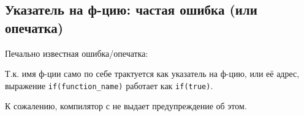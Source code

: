 \subsection{Указатель на ф-цию: частая ошибка (или опечатка)}

Печально известная ошибка/опечатка:



Т.к. имя ф-ции само по себе трактуется как указатель на ф-цию, или её адрес,\\
выражение \verb|if(function_name)| работает как \verb|if(true)|.

К сожалению, компилятор с \CCpp не выдает предупреждение об этом.

